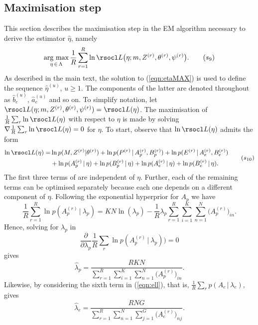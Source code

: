 \documentclass[11pt]{amsart}
\theoremstyle{definition}
\begin{document}
\subsection{Maximisation step}
This section describes the maximisation step in the EM algorithm
necessary to derive the estimator $\hat\eta$, namely
\begin{equation}
   \label{eqn:etaMAX}
    \underset{\eta\,\in\,\Lambda}{\text{arg max}}\,
    \frac{1}{R}\sum_{r=1}^R \ln \rsocl L\big(\eta; m, Z^{(r)},
    \theta^{(r)}, \psi^{(r)}\big). \tag{$s_9$}
\end{equation}
As described in the main text, the solution to (\ref{eqn:etaMAX}) is
used to define the sequence $\hat\eta^{(u)}$, $u \geq 1$. The
components of the latter are denoted throughout as $\hat b_e^{(u)}$,
$\hat a_e^{(u)}$ and so on.  To simplify notation, let $\rsocl L(\eta;
m, Z^{(r)}, \theta^{(r)}, \psi^{(r)}) = \rsocl L(\eta)$. The
maximisation of $\frac{1}{R}\sum_{r} \ln \rsocl L(\eta)$ with respect
to $\eta$ is made by solving $\nabla\frac{1}{R}\sum_{r}\ln \rsocl
L(\eta) = 0$ for $\eta$.  To start, observe that $\ln \rsocl L(\eta)$
admits the form
\begin{equation}
 \label{eqn:ell}
 \begin{aligned}
  \ln \rsocl L(\eta)
  =&
  \ln p(M, Z^{(r)} | \theta^{(r)})  + \ln p(P^{(r)}\,|\, A_p^{(r)},
  B_p^{(r)}) + \ln p(E^{(r)}\,|\, A_e^{(r)},  B_e^{(r)})  \\
  &+
  \ln p(A_p^{(r)}\,|\, \eta) + \ln p(B_p^{(r)}\,|\, \eta) +
  \ln p(A_e^{(r)}\,|\, \eta) + \ln p(B_e^{(r)}\,|\, \eta).
 \end{aligned}
 \tag{$s_{10}$}
\end{equation}
The first three terms of are independent of
$\eta$. Further, each of the remaining terms can be optimised
separately because each one depends on a different component of
$\eta$. Following the exponential hyperprior for $A_p$ we have
\[
   \frac{1}{R}\sum_{r=1}^R \ln  p(A_p^{(r)}\,|\ \lambda_p)
  =
  KN\ln(\lambda_p) - \frac{1}{R}\lambda_p
  \sum_{r=1}^R\sum_{i=1}^K\sum_{n=1}^N \big(A_p^{(r)}\big)_{in}.
\]
Hence, solving for $\lambda_p$ in
\[
  \frac{\partial}{\partial\lambda_p} \frac{1}{R}\sum_r \ln
  p(A_p^{(r)}\,|\ \lambda_p)) = 0
\]
gives
\[
  \widehat\lambda_p = \frac{RKN}{\sum_{r=1}^R \sum_{i=1}^K
    \sum_{n=1}^N \big(A_p^{(r)}\big)_{in}}.
\]
Likewise, by considering the sixth term in
(\ref{eqn:ell}), that is, $\frac{1}{R} \sum_r
p(A_e\,|\, \lambda_e)$, gives
\[
  \widehat\lambda_e = \frac{RNG}{\sum_{r=1}^R \sum_{n=1}^N
    \sum_{j=1}^G \big(A_e^{(r)}\big)_{nj}}.
\]
\end{document}
